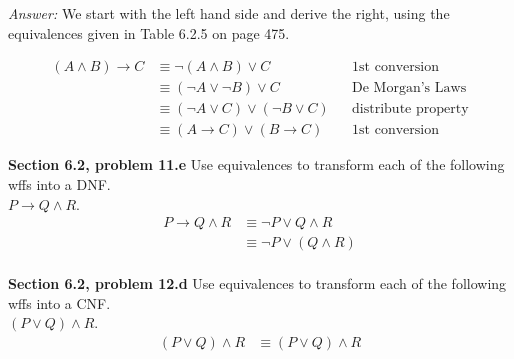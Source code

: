 \documentclass[12pt]{article}
\begin{document}
\emph{Answer:} We start with the left hand side and derive the right,
using the equivalences given in Table 6.2.5 on page 475.

\begin{align*}
(A \land B) \rightarrow C
  & \equiv \neg (A \land B) \lor C                       && \text{1st conversion} \\
  & \equiv (\neg A \lor \neg B) \lor C                  && \text{De Morgan's Laws}\\
  & \equiv (\neg A \lor C) \lor (\neg B \lor C)         && \text{distribute property} \\
  & \equiv (A \rightarrow C) \lor (B \rightarrow C)     && \text{1st conversion}
\end{align*}

\textbf{Section 6.2, problem 11.e} Use equivalences to transform each of the following wffs into a DNF. \\
$P \rightarrow Q \land R$.
\begin{align*}
P \rightarrow Q \land R
 & \equiv \neg P \lor Q \land R \\
 & \equiv \neg P \lor (Q \land R) \\
\end{align*}

\textbf{Section 6.2, problem 12.d} Use equivalences to transform each of the following wffs into a CNF. \\
$(P \lor Q) \land R$.
\begin{align*}
(P \lor Q) \land R
 & \equiv (P \lor Q) \land R \\
\end{align*}
\end{document}
